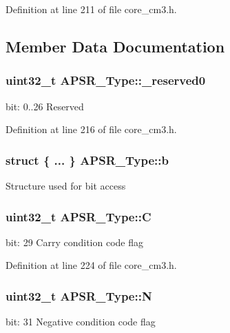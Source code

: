 Definition at line 211 of file core\+\_\+cm3.\+h.



\subsection{Member Data Documentation}
\subsubsection[{\texorpdfstring{\+\_\+reserved0}{_reserved0}}]{\setlength{\rightskip}{0pt plus 5cm}uint32\+\_\+t A\+P\+S\+R\+\_\+\+Type\+::\+\_\+reserved0}\hypertarget{unionAPSR__Type_afbce95646fd514c10aa85ec0a33db728}{}\label{unionAPSR__Type_afbce95646fd514c10aa85ec0a33db728}
bit\+: 0..26 Reserved 

Definition at line 216 of file core\+\_\+cm3.\+h.

\subsubsection[{\texorpdfstring{b}{b}}]{\setlength{\rightskip}{0pt plus 5cm}struct \{ ... \}   A\+P\+S\+R\+\_\+\+Type\+::b}\hypertarget{unionAPSR__Type_a7dbc79a057ded4b11ca5323fc2d5ab14}{}\label{unionAPSR__Type_a7dbc79a057ded4b11ca5323fc2d5ab14}
Structure used for bit access 
\subsubsection[{\texorpdfstring{C}{C}}]{\setlength{\rightskip}{0pt plus 5cm}uint32\+\_\+t A\+P\+S\+R\+\_\+\+Type\+::C}\hypertarget{unionAPSR__Type_a86e2c5b891ecef1ab55b1edac0da79a6}{}\label{unionAPSR__Type_a86e2c5b891ecef1ab55b1edac0da79a6}
bit\+: 29 Carry condition code flag 

Definition at line 224 of file core\+\_\+cm3.\+h.

\subsubsection[{\texorpdfstring{N}{N}}]{\setlength{\rightskip}{0pt plus 5cm}uint32\+\_\+t A\+P\+S\+R\+\_\+\+Type\+::N}\hypertarget{unionAPSR__Type_a7e7bbba9b00b0bb3283dc07f1abe37e0}{}\label{unionAPSR__Type_a7e7bbba9b00b0bb3283dc07f1abe37e0}
bit\+: 31 Negative condition code flag 

